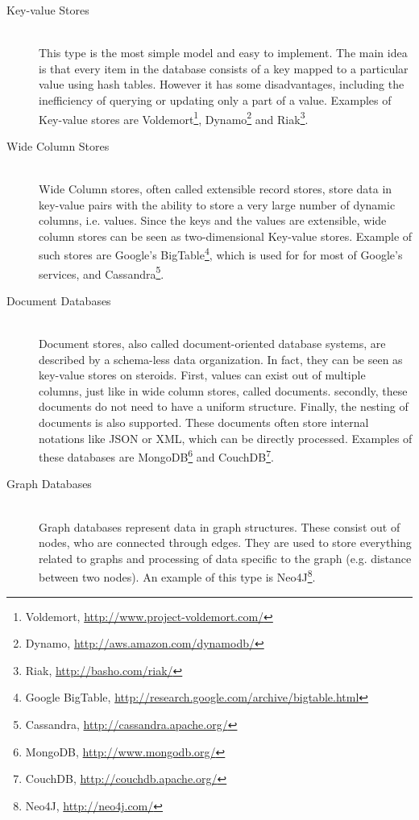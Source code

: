 \documentclass[a4paper,12pt]{report}
\begin{document}
\begin{description}
    \item[Key-value Stores] \hfill \\This type is the most simple model and easy to implement. The main idea is that every item in the database consists of a key mapped to a particular value using hash tables. However it has some disadvantages, including the inefficiency of querying or updating only a part of a value. Examples of Key-value stores are Voldemort\footnote{Voldemort, \url{http://www.project-voldemort.com/}}, Dynamo\footnote{Dynamo, \url{http://aws.amazon.com/dynamodb/}} and Riak\footnote{Riak, \url{http://basho.com/riak/}}.
    \item[Wide Column Stores] \hfill \\Wide Column stores, often called extensible record stores, store data in key-value pairs with the ability to store a very large number of dynamic columns, i.e. values. Since the keys and the values are extensible, wide column stores can be seen as two-dimensional Key-value stores. Example of such stores are Google's BigTable\footnote{Google BigTable, \url{http://research.google.com/archive/bigtable.html}}, which is used for for most of Google's services, and Cassandra\footnote{Cassandra, \url{http://cassandra.apache.org/}}.
    \item[Document Databases] \hfill \\Document stores, also called document-oriented database systems, are described by a schema-less data organization. In fact, they can be seen as key-value stores on steroids. First, values can exist out of multiple columns, just like in wide column stores, called documents. secondly, these documents do not need to have a uniform structure. Finally, the nesting of documents is also supported. These documents often store internal notations like JSON or XML, which can be directly processed. Examples of these databases are MongoDB\footnote{MongoDB, \url{http://www.mongodb.org/}} and CouchDB\footnote{CouchDB, \url{http://couchdb.apache.org/}}.    
    \item[Graph Databases] \hfill \\Graph databases represent data in graph structures. These consist out of nodes, who are connected through edges. They are used to store everything related to graphs and processing of data specific to the graph (e.g. distance between two nodes). An example of this type is Neo4J\footnote{Neo4J, \url{http://neo4j.com/}}.    
\end{description}
\end{document}
